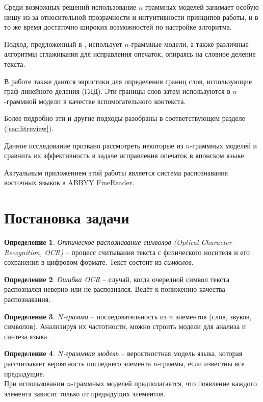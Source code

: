 \documentclass[14pt,russian]{extreport}
\theoremstyle{definition}
\newtheorem{definition}{Определение}[subsection]
\begin{document}
Среди возможных решений использование $n$-граммных моделей занимает особую нишу из-за относительной прозрачности и интуитивности принципов работы, и в то же время достаточно широких возможностей по настройке алгоритма.

Подход, предложенный в \cite{nagata:shape}, использует $n$-граммные модели, а также различные алгоритмы сглаживания для исправления опечаток, опираясь на словное деление текста. 

В работе \cite{nagata:context} также даются эвристики для определения границ слов, использующие граф линейного деления (ГЛД). Эти границы слов затем используются в $n$-граммной модели в качестве вспомогательного контекста.

Более подробно эти и другие подходы разобраны в соответствующем разделе (\ref{sec:litreview}).

Данное исследование призвано рассмотреть некоторые из $n$-граммных моделей и сравнить их эффективность в задаче исправления опечаток в японском языке.

Актуальным приложением этой работы является система распознавания восточных языков в ABBYY FineReader.

\section{ Постановка задачи }\label{sec:taskdef}

\begin{definition}{\textit{Оптическое распознавание символов (Optical Character Recognition, OCR)}} -- процесс считывания текста с физического носителя и его сохранения в цифровом формате. Текст состоит из \textit{символов}.
\end{definition}

\begin{definition}{\textit{Ошибка OCR}} -- случай, когда очередной символ текста распознался неверно или не распознался. Ведёт к понижению качества распознавания.
\end{definition}

\begin{definition}{\textit{$N$-грамма}} -- последовательность из $n$ элементов (слов, звуков, символов). Анализируя их частотности, можно строить модели для анализа и синтеза языка.
\end{definition}

\begin{definition}{\textit{$N$-граммная модель}} -- вероятностная модель языка, которая рассчитывает вероятность последнего элемента $n$-граммы, если известны все предыдущие. \\
При использовании $n$-граммных моделей предполагается, что появление каждого элемента зависит только от предыдущих элементов.
\end{definition}
\end{document}
